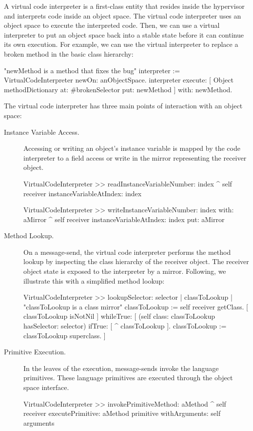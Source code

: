 A virtual code interpreter is a first-class entity that resides inside the hypervisor and interprets code inside an object space. The virtual code interpreter uses an object space to execute the interpreted code. Then, we can use a virtual interpreter to put an object space back into a stable state before it can continue its own execution. For example, we can use the virtual interpreter to replace a broken method in the basic class hierarchy:

\begin{code}
"newMethod is a method that fixes the bug"
interpreter := VirtualCodeInterpreter newOn: anObjectSpace.
interpreter
	execute: [ Object methodDictionary at: #brokenSelector put: newMethod ]
	with: newMethod.
\end{code}

The virtual code interpreter has three main points of interaction with an object space:

\begin{description}
\item[Instance Variable Access.] Accessing or writing an object's instance variable is mapped by the code interpreter to a field access or write in the mirror representing the receiver object.

\begin{code}
VirtualCodeInterpreter >> readInstanceVariableNumber: index
    ^ self receiver instanceVariableAtIndex: index
    
VirtualCodeInterpreter >> writeInstanceVariableNumber: index with: aMirror
    ^ self receiver instanceVariableAtIndex: index put: aMirror
\end{code}

\item[Method Lookup.] On a message-send, the virtual code interpreter performs the method lookup by inspecting the class hierarchy of the receiver object. The receiver object state is exposed to the interpreter by a mirror. Following, we illustrate this with a simplified method lookup:

\begin{code}
VirtualCodeInterpreter >> lookupSelector: selector
    | classToLookup |
    "classToLookup is a class mirror"
    classToLookup := self receiver getClass.
    [ classToLookup isNotNil ] whileTrue: [
        (self class: classToLookup hasSelector: selector)
        	    ifTrue: [ ^ classToLookup ].
	classToLookup := classToLookup superclass.
    ]
\end{code}

\item[Primitive Execution.] In the leaves of the execution, message-sends invoke the language primitives. These language primitives are executed through the object space interface.

\begin{code}
VirtualCodeInterpreter >> invokePrimitiveMethod: aMethod
    ^ self receiver
         executePrimitive: aMethod primitive
         withArguments: self arguments
\end{code}

\end{description}

